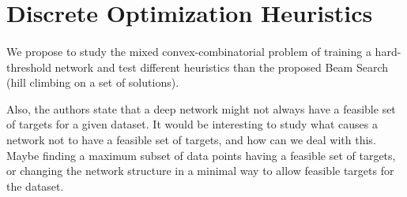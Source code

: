 \section{Discrete Optimization Heuristics}
\paragraph{}
We propose to study the mixed convex-combinatorial problem of training a hard-threshold network and test different heuristics than the proposed Beam Search (hill climbing on a set of solutions). 

Also, the authors state that a deep network might not always have a feasible set of targets for a given dataset. It would be interesting to study what causes a network not to have a feasible set of targets, and how can we deal with this. Maybe finding a maximum subset of data points having a feasible set of targets, or changing the network structure in a minimal way to allow feasible targets for the dataset.